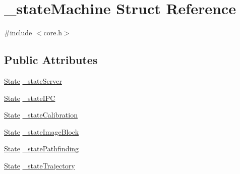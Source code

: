 \hypertarget{struct__state_machine}{\section{\-\_\-state\-Machine Struct Reference}
\label{struct__state_machine}
}


{\ttfamily \#include $<$core.\-h$>$}

\subsection*{Public Attributes}
\begin{DoxyCompactItemize}
\item 
\hyperlink{core_8h_a5d74787dedbc4e11c1ab15bf487e61f8}{State} \hyperlink{struct__state_machine_aaee24e4ab99a6f1243a46645188de8d0}{\-\_\-state\-Server}
\item 
\hyperlink{core_8h_a5d74787dedbc4e11c1ab15bf487e61f8}{State} \hyperlink{struct__state_machine_aa6cc70d0567b403fb9e993a681f48b85}{\-\_\-state\-I\-P\-C}
\item 
\hyperlink{core_8h_a5d74787dedbc4e11c1ab15bf487e61f8}{State} \hyperlink{struct__state_machine_a157036ced733a021849ebcbc98c27200}{\-\_\-state\-Calibration}
\item 
\hyperlink{core_8h_a5d74787dedbc4e11c1ab15bf487e61f8}{State} \hyperlink{struct__state_machine_adbc0e51d4bed9b6da5c44e921e37dc32}{\-\_\-state\-Image\-Block}
\item 
\hyperlink{core_8h_a5d74787dedbc4e11c1ab15bf487e61f8}{State} \hyperlink{struct__state_machine_a79ce614ae01c3759d155c03026384ca7}{\-\_\-state\-Pathfinding}
\item 
\hyperlink{core_8h_a5d74787dedbc4e11c1ab15bf487e61f8}{State} \hyperlink{struct__state_machine_a88c6e0c15cdd29b3eec2e842fa09b08f}{\-\_\-state\-Trajectory}
\end{DoxyCompactItemize}


